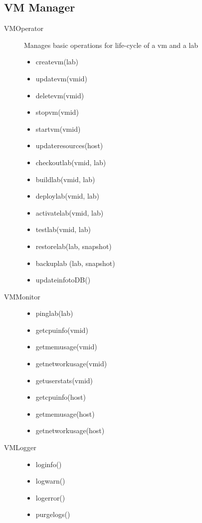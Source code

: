 \documentclass[11pt]{article}
\begin{document}
\subsection{VM Manager}
\label{sec-4.2}


\begin{description}
\item [VMOperator] Manages basic operations for life-cycle of a vm and a lab

\begin{itemize}
\item createvm(lab)
\item updatevm(vmid)
\item deletevm(vmid)
\item stopvm(vmid)
\item startvm(vmid)
\item updateresources(host)
\item checkoutlab(vmid, lab)
\item buildlab(vmid, lab)
\item deploylab(vmid, lab)
\item activatelab(vmid, lab)
\item testlab(vmid, lab)
\item restorelab(lab, snapshot)
\item backuplab (lab, snapshot)
\item updateinfotoDB()
\end{itemize}

\item [VMMonitor]

\begin{itemize}
\item pinglab(lab)
\item getcpuinfo(vmid)
\item getmemusage(vmid)
\item getnetworkusage(vmid)
\item getuserstats(vmid)
\item getcpuinfo(host)
\item getmemusage(host)
\item getnetworkusage(host)
\end{itemize}

\item [VMLogger]

\begin{itemize}
\item loginfo()
\item logwarn()
\item logerror()
\item purgelogs()
\end{itemize}


\end{description}
\end{document}
